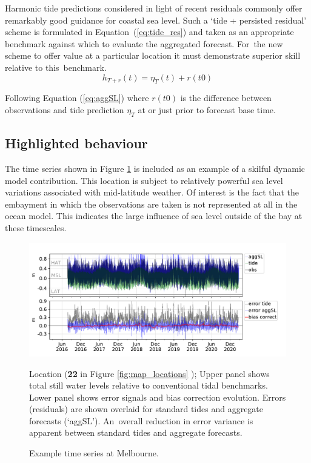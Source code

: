 Harmonic tide predictions considered in light of recent residuals commonly offer remarkably good guidance for coastal sea level.
Such a `tide + persisted residual' scheme is formulated in Equation~(\ref{eq:tide_res}) and taken as an appropriate benchmark against which to evaluate the aggregated forecast.
For~the new scheme to offer value at a particular location it must demonstrate superior skill relative to this~benchmark.  
\begin{equation}
h_{T+r}(t) = \eta_{T}(t) + r(t0)
\label{eq:tide_res}
\end{equation}

Following Equation (\ref{eq:aggSL}) where $r(t0)$ is the difference between observations and tide prediction $\eta_{T}$ at or just prior to forecast base time. 

\subsection{Highlighted behaviour}
The time series shown in Figure \ref{fig:ts_melb} is included as an example of a skilful dynamic model contribution.  
This location is subject to relatively powerful sea level variations associated with mid-latitude weather.
Of interest is the fact that the embayment in which the observations are taken is not represented at all in the ocean model.  This indicates the large influence of sea level outside of the bay at these timescales. 

\begin{figure}[!hbt] \centering
    \includegraphics[width=\figwidthFull]{figures/plots/586204_verify_ts.pdf}
    \caption{Example time series at Melbourne.}
    {Location (\textbf{22} in Figure \ref{fig:map_locations} ); Upper panel shows total still water levels relative to conventional tidal benchmarks. Lower panel shows error signals and bias correction evolution.  Errors (residuals) are shown overlaid for standard tides and aggregate forecasts (`aggSL').  An~overall reduction in error variance is apparent between standard tides and aggregate forecasts.}
\label{fig:ts_melb}
\end{figure}   


